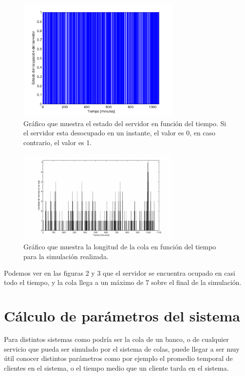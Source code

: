 \documentclass[10pt,journal,compsoc]{IEEEtran}
\begin{document}
\begin{figure}[t]%
\label{fig:estadoservidor}
\begin{center}
\centering
\includegraphics[width=3.2in]{estado_servidor}
\caption{Gr\'afico que muestra el estado del servidor en funci\'on del tiempo. Si el servidor esta desocupado en un instante, el valor es $0$, en caso contrario, el valor es 1.}
\end{center}
\end{figure}

\begin{figure}[t]%
\label{fig:longitudcola}
\begin{center}
\centering
\includegraphics[width=3.2in]{gente_en_cola}
\caption{Gr\'afico que muestra la longitud de la cola en funci\'on del tiempo para la simulaci\'on realizada.}
\end{center}
\end{figure}

Podemos ver en las figuras 2 y 3 que el servidor se encuentra ocupado en casi todo el tiempo, y la cola
llega a un m\'aximo de $7$ sobre el final de la simulaci\'on.

\section{C\'alculo de par\'ametros del sistema} %
Para distintos sistemas como podr\'ia ser la cola de un banco, o de cualquier servicio que pueda ser
simulado por el sistema de colas, puede llegar a ser muy \'util conocer distintos par\'ametros como
por ejemplo el promedio temporal de clientes en el sistema, o el tiempo medio que un cliente tarda
en el sistema.
\end{document}
